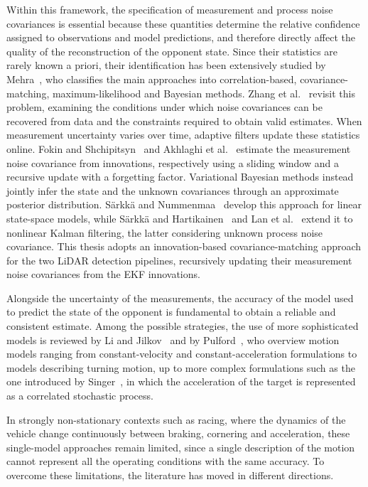 Within this framework, the specification of measurement and process noise covariances is essential because these quantities determine the relative confidence assigned to observations and model predictions, and therefore directly affect the quality of the reconstruction of the opponent state. Since their statistics are rarely known a priori, their identification has been extensively studied by Mehra~\cite{mehra1970,mehra1972}, who classifies the main approaches into correlation-based, covariance-matching, maximum-likelihood and Bayesian methods. Zhang et al.~\cite{zhang2020} revisit this problem, examining the conditions under which noise covariances can be recovered from data and the constraints required to obtain valid estimates. When measurement uncertainty varies over time, adaptive filters update these statistics online. Fokin and Shchipitsyn~\cite{fokin2009} and Akhlaghi et al.~\cite{akhlaghi2017} estimate the measurement noise covariance from innovations, respectively using a sliding window and a recursive update with a forgetting factor. Variational Bayesian methods instead jointly infer the state and the unknown covariances through an approximate posterior distribution. S\"arkk\"a and Nummenmaa~\cite{sarkka2009} develop this approach for linear state-space models, while S\"arkk\"a and Hartikainen~\cite{sarkka2013} and Lan et al.~\cite{lan2023} extend it to nonlinear Kalman filtering, the latter considering unknown process noise covariance. This thesis adopts an innovation-based covariance-matching approach for the two LiDAR detection pipelines, recursively updating their measurement noise covariances from the EKF innovations.

Alongside the uncertainty of the measurements, the accuracy of the model used to predict the state of the opponent is fundamental to obtain a reliable and consistent estimate. Among the possible strategies, the use of more sophisticated models is reviewed by Li and Jilkov~\cite{li2003models} and by Pulford~\cite{pulford2015}, who overview motion models ranging from constant-velocity and constant-acceleration formulations to models describing turning motion, up to more complex formulations such as the one introduced by Singer~\cite{singer1970}, in which the acceleration of the target is represented as a correlated stochastic process.

In strongly non-stationary contexts such as racing, where the dynamics of the vehicle change continuously between braking, cornering and acceleration, these single-model approaches remain limited, since a single description of the motion cannot represent all the operating conditions with the same accuracy. To overcome these limitations, the literature has moved in different directions.

